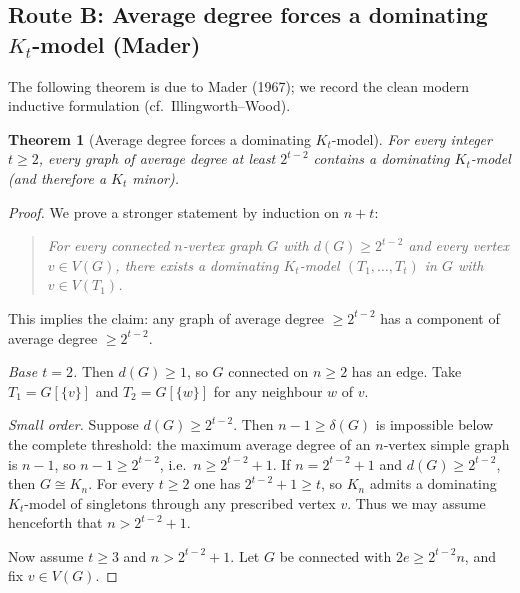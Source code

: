 \documentclass[11pt]{article}
\newtheorem{theorem}{Theorem}[section]
\theoremstyle{definition}
\begin{document}
\subsection{Route B: Average degree forces a dominating \(K_t\)-model (Mader)}

The following theorem is due to Mader (1967); we record the clean modern
inductive formulation (cf.\ Illingworth--Wood).

\begin{theorem}[Average degree forces a dominating \(K_t\)-model]
\label{thm:avg-dom}
For every integer \(t\ge 2\), every graph of average degree at least
\(2^{t-2}\) contains a dominating \(K_t\)-model (and therefore a \(K_t\) minor).
\end{theorem}

\begin{proof}
We prove a stronger statement by induction on \(n+t\):
\begin{quote}
\emph{For every connected \(n\)-vertex graph \(G\) with \(d(G)\ge 2^{t-2}\) and
every vertex \(v\in V(G)\), there exists a dominating \(K_t\)-model
\((T_1,\dots,T_t)\) in \(G\) with \(v\in V(T_1)\).}
\end{quote}
This implies the claim: any graph of average degree \(\ge 2^{t-2}\) has a
component of average degree \(\ge 2^{t-2}\).

\emph{Base \(t=2\).} Then \(d(G)\ge 1\), so \(G\) connected on \(n\ge 2\) has an
edge. Take \(T_1=G[\{v\}]\) and \(T_2=G[\{w\}]\) for any neighbour \(w\) of \(v\).

\emph{Small order.} Suppose \(d(G)\ge 2^{t-2}\). Then \(n-1\ge\delta(G)\) is impossible
below the complete threshold: the maximum average degree of an \(n\)-vertex simple
graph is \(n-1\), so \(n-1\ge 2^{t-2}\), i.e.\ \(n\ge 2^{t-2}+1\). If
\(n=2^{t-2}+1\) and \(d(G)\ge 2^{t-2}\), then \(G\cong K_n\). For every
\(t\ge 2\) one has \(2^{t-2}+1\ge t\), so \(K_n\) admits a dominating \(K_t\)-model
of singletons through any prescribed vertex \(v\). Thus we may assume henceforth
that \(n>2^{t-2}+1\).

Now assume \(t\ge 3\) and \(n>2^{t-2}+1\). Let \(G\) be connected with
\(2e\ge 2^{t-2}n\), and fix \(v\in V(G)\).


\end{proof}
\end{document}
